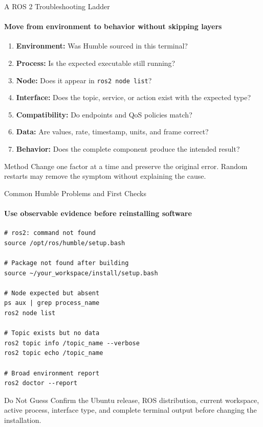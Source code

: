 \begin{frame}{A ROS 2 Troubleshooting Ladder}
\framesubtitle{Move from environment to behavior without skipping layers}
\begin{enumerate}
\item \textbf{Environment:} Was Humble sourced in this terminal?
\item \textbf{Process:} Is the expected executable still running?
\item \textbf{Node:} Does it appear in \texttt{ros2 node list}?
\item \textbf{Interface:} Does the topic, service, or action exist with the expected type?
\item \textbf{Compatibility:} Do endpoints and QoS policies match?
\item \textbf{Data:} Are values, rate, timestamp, units, and frame correct?
\item \textbf{Behavior:} Does the complete component produce the intended result?
\end{enumerate}
\begin{alertblock}{Method}
Change one factor at a time and preserve the original error. Random restarts may remove the symptom without explaining the cause.
\end{alertblock}
\end{frame}

\begin{frame}[fragile]{Common Humble Problems and First Checks}
\framesubtitle{Use observable evidence before reinstalling software}
\scriptsize
\begin{verbatim}
# ros2: command not found
source /opt/ros/humble/setup.bash

# Package not found after building
source ~/your_workspace/install/setup.bash

# Node expected but absent
ps aux | grep process_name
ros2 node list

# Topic exists but no data
ros2 topic info /topic_name --verbose
ros2 topic echo /topic_name

# Broad environment report
ros2 doctor --report
\end{verbatim}
\begin{alertblock}{Do Not Guess}
Confirm the Ubuntu release, ROS distribution, current workspace, active process, interface type, and complete terminal output before changing the installation.
\end{alertblock}
\end{frame}

